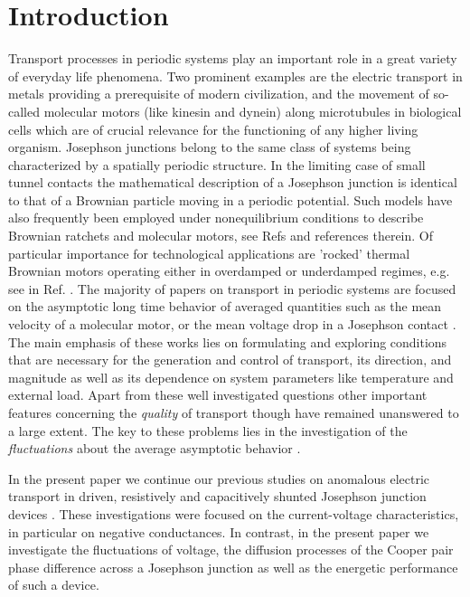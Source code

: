 \documentclass[a4,twocolumn,showpacs,showkeys]{revtex4}
\begin{document}

\section{Introduction}

Transport processes in periodic systems play an important role 
in   a great variety of everyday life phenomena.     
Two prominent examples are the  electric transport in metals providing
a prerequisite of  modern civilization, and the movement 
of so-called molecular motors 
(like kinesin and dynein) along microtubules in biological cells which
are of crucial relevance for the functioning of any higher living organism.
Josephson junctions belong to the same class of systems being
characterized by a spatially periodic structure.  In the limiting case
of small tunnel contacts the mathematical description of a Josephson
junction is identical to that of a Brownian particle moving in a
periodic potential. Such models have also frequently been
employed under nonequilibrium conditions to
describe Brownian ratchets and molecular motors,
see Refs  \cite{hanRev,motor} and references therein.  
Of particular importance for technological applications are 'rocked' thermal Brownian motors
operating either in  overdamped or  underdamped regimes, e.g. see in Ref.  \cite{rocked}. 
The majority of papers on transport in periodic systems are focused on the asymptotic
long time behavior of averaged quantities such as the mean velocity
of a molecular motor, or the mean voltage drop in a Josephson contact
\cite{ratchet}. The main emphasis of these works lies  on formulating
and exploring    conditions that are necessary for the generation and control of
transport, its direction, 
and magnitude as well as its dependence on system parameters like temperature
and external load. Apart from these well investigated questions  
other important features concerning the {\it   quality} of transport though have remained 
unanswered to a large extent.  The key to
these problems lies in the investigation of the {\it fluctuations} about the
average asymptotic behavior \cite{machuraJPC}. 

In the present paper we
continue our previous studies on anomalous electric transport in driven,
resistively and capacitively shunted Josephson junction devices  
\cite{machuraPRL,aip,kosturPRB}. 
These  investigations were focused on the current-voltage
characteristics, in particular on  negative conductances.  In contrast, in the present paper we
investigate the fluctuations of voltage, the  diffusion processes of
the Cooper pair phase difference across a Josephson junction as well
as the energetic performance of such a device. 
\end{document}
